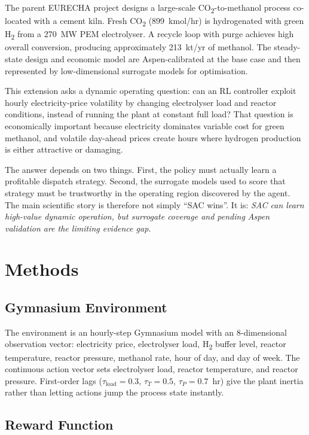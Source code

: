 \documentclass[11pt,a4paper]{article}
\begin{document}
The parent EURECHA project designs a large-scale CO\textsubscript{2}-to-methanol
process co-located with a cement kiln. Fresh CO\textsubscript{2}
(899~kmol/hr) is hydrogenated with green H\textsubscript{2} from a 270~MW
PEM electrolyser. A recycle loop with purge achieves high overall conversion,
producing approximately 213~kt/yr of methanol. The steady-state design and
economic model are Aspen-calibrated at the base case and then represented by
low-dimensional surrogate models for optimisation.

This extension asks a dynamic operating question: can an RL controller exploit
hourly electricity-price volatility by changing electrolyser load and reactor
conditions, instead of running the plant at constant full load? That question
is economically important because electricity dominates variable cost for
green methanol, and volatile day-ahead prices create hours where hydrogen
production is either attractive or damaging.

The answer depends on two things. First, the policy must actually learn a
profitable dispatch strategy. Second, the surrogate models used to score that
strategy must be trustworthy in the operating region discovered by the agent.
The main scientific story is therefore not simply ``SAC wins''. It is:
\emph{SAC can learn high-value dynamic operation, but surrogate coverage and
pending Aspen validation are the limiting evidence gap.}

\section{Methods}

\subsection{Gymnasium Environment}

The environment is an hourly-step Gymnasium model with an 8-dimensional
observation vector: electricity price, electrolyser load, H\textsubscript{2}
buffer level, reactor temperature, reactor pressure, methanol rate, hour of
day, and day of week. The continuous action vector sets electrolyser load,
reactor temperature, and reactor pressure. First-order lags
($\tau_{\mathrm{load}}=0.3$, $\tau_T=0.5$, $\tau_P=0.7$~hr) give the plant
inertia rather than letting actions jump the process state instantly.

\subsection{Reward Function}
\end{document}

